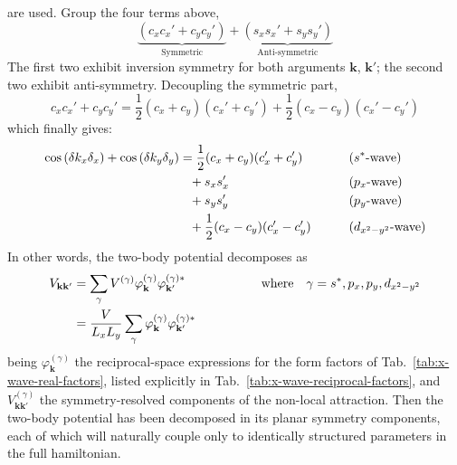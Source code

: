 are used. Group the four terms above,
\begin{equation}\label{eq:sym-asym-couplings-gap}
	\underbrace{
		\left(c_x c_x' + c_y c_y' \right) 
	}_\text{Symmetric}
	+ \underbrace{
		\left(s_x s_x' + s_y s_y' \right)
	}_\text{Anti-symmetric}
\end{equation}
The first two exhibit inversion symmetry for both arguments $\mathbf{k}$, $\mathbf{k}'$; the second two exhibit anti-symmetry. Decoupling the symmetric part,
\[
	c_x c_x' + c_y c_y' = \frac{1}{2} (c_x + c_y)(c_x' + c_y') + \frac{1}{2} (c_x - c_y)(c_x' - c_y')
\]
which finally gives:
\[
\begin{aligned}
	\cos \left( \delta k_x \delta_x \right)	+ \cos \left( \delta k_y \delta_y \right) &= \frac{1}{2}  (c_x + c_y)(c_x' + c_y') &&\qquad\text{($s^*$-wave)} \\
	&\hphantom{=}+ s_x s_x' &&\qquad\text{($p_x$-wave)} \\
	&\hphantom{=}+ s_y s_y' &&\qquad\text{($p_y$-wave)} \\
	&\hphantom{=}+ \frac{1}{2} (c_x - c_y)(c_x' - c_y') &&\qquad\text{($d_{x^2-y^2}$-wave)}
\end{aligned}
\]
In other words, the two-body potential decomposes as
\[
\begin{aligned}
	V_{\mathbf{k}\mathbf{k}'} &= \sum_\gamma V^{(\gamma)} \varphi_\mathbf{k}^{(\gamma)} \varphi_{\mathbf{k}'}^{(\gamma)*}
	\hspace{5em}\qq{where}
	\gamma = s^*, p_x, p_y, d_{x^2-y^2} \\
	&= \frac{V}{L_xL_y} \sum_\gamma \varphi_\mathbf{k}^{(\gamma)} \varphi_{\mathbf{k}'}^{(\gamma)*}
\end{aligned}
\]
being $\varphi_\mathbf{k}^{(\gamma)}$ the reciprocal-space expressions for the form factors of Tab.~\ref{tab:x-wave-real-factors}, listed explicitly in Tab.~\ref{tab:x-wave-reciprocal-factors}, and $V_{\mathbf{k}\mathbf{k}'}^{(\gamma)}$ the symmetry-resolved components of the non-local attraction. Then the two-body potential has been decomposed in its planar symmetry components, each of which will naturally couple only to identically structured parameters in the full hamiltonian.

